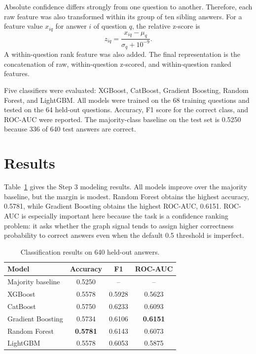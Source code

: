 \documentclass[conference]{IEEEtran}
\begin{document}
Absolute confidence differs strongly from one question to another. Therefore,
each raw feature was also transformed within its group of ten sibling answers.
For a feature value $x_{iq}$ for answer $i$ of question $q$, the relative
z-score is
\begin{equation}
    z_{iq} = \frac{x_{iq} - \mu_q}{\sigma_q + 10^{-9}}.
\end{equation}
A within-question rank feature was also added. The final representation is the
concatenation of raw, within-question z-scored, and within-question ranked
features.

Five classifiers were evaluated: XGBoost, CatBoost, Gradient Boosting, Random
Forest, and LightGBM. All models were trained on the 68 training questions and
tested on the 64 held-out questions. Accuracy, F1 score for the correct class,
and ROC-AUC were reported. The majority-class baseline on the test set is
0.5250 because 336 of 640 test answers are correct.

\section{Results}
Table~\ref{tab:results} gives the Step 3 modeling results. All models improve
over the majority baseline, but the margin is modest. Random Forest obtains the
highest accuracy, 0.5781, while Gradient Boosting obtains the highest ROC-AUC,
0.6151. ROC-AUC is especially important here because the task is a confidence
ranking problem: it asks whether the graph signal tends to assign higher
correctness probability to correct answers even when the default 0.5 threshold
is imperfect.

\begin{table}[t]
\caption{Classification results on 640 held-out answers.}
\label{tab:results}
\centering
\begin{tabular}{lccc}
\toprule
Model & Accuracy & F1 & ROC-AUC \\
\midrule
Majority baseline & 0.5250 & -- & -- \\
XGBoost & 0.5578 & 0.5928 & 0.5623 \\
CatBoost & 0.5750 & 0.6233 & 0.6093 \\
Gradient Boosting & 0.5734 & 0.6106 & \textbf{0.6151} \\
Random Forest & \textbf{0.5781} & 0.6143 & 0.6073 \\
LightGBM & 0.5578 & 0.6053 & 0.5875 \\
\bottomrule
\end{tabular}
\end{table}
\end{document}

